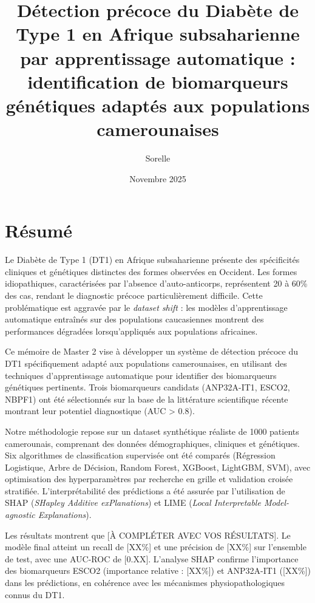 \documentclass[12pt,a4paper,oneside]{report}
\title{Détection précoce du Diabète de Type 1 en Afrique subsaharienne par apprentissage automatique : identification de biomarqueurs génétiques adaptés aux populations camerounaises}
\author{Sorelle}
\date{Novembre 2025}
\begin{document}


\thispagestyle{empty}
\clearpage
\null
\clearpage

\setcounter{page}{1}

\chapter*{Résumé}

Le Diabète de Type 1 (DT1) en Afrique subsaharienne présente des spécificités cliniques et génétiques distinctes des formes observées en Occident. Les formes idiopathiques, caractérisées par l'absence d'auto-anticorps, représentent 20 à 60\% des cas, rendant le diagnostic précoce particulièrement difficile. Cette problématique est aggravée par le \textit{dataset shift} : les modèles d'apprentissage automatique entraînés sur des populations caucasiennes montrent des performances dégradées lorsqu'appliqués aux populations africaines.

\vspace{0.3cm}

Ce mémoire de Master 2 vise à développer un système de détection précoce du DT1 spécifiquement adapté aux populations camerounaises, en utilisant des techniques d'apprentissage automatique pour identifier des biomarqueurs génétiques pertinents. Trois biomarqueurs candidats (ANP32A-IT1, ESCO2, NBPF1) ont été sélectionnés sur la base de la littérature scientifique récente montrant leur potentiel diagnostique (AUC > 0.8).

\vspace{0.3cm}

Notre méthodologie repose sur un dataset synthétique réaliste de 1000 patients camerounais, comprenant des données démographiques, cliniques et génétiques. Six algorithmes de classification supervisée ont été comparés (Régression Logistique, Arbre de Décision, Random Forest, XGBoost, LightGBM, SVM), avec optimisation des hyperparamètres par recherche en grille et validation croisée stratifiée. L'interprétabilité des prédictions a été assurée par l'utilisation de SHAP (\textit{SHapley Additive exPlanations}) et LIME (\textit{Local Interpretable Model-agnostic Explanations}).

\vspace{0.3cm}

Les résultats montrent que [À COMPLÉTER AVEC VOS RÉSULTATS]. Le modèle final atteint un recall de [XX\%] et une précision de [XX\%] sur l'ensemble de test, avec une AUC-ROC de [0.XX]. L'analyse SHAP confirme l'importance des biomarqueurs ESCO2 (importance relative : [XX\%]) et ANP32A-IT1 ([XX\%]) dans les prédictions, en cohérence avec les mécanismes physiopathologiques connus du DT1.
\end{document}
